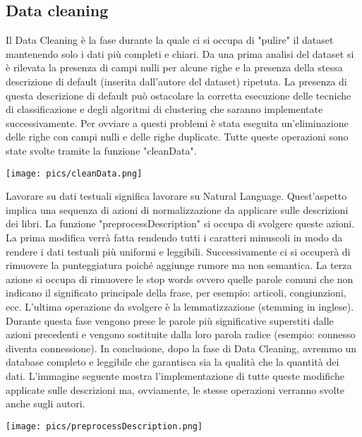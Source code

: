 \documentclass[12pt,oneside]{article}
\begin{document}
    \begin{enumerate}
    \subsection{Data cleaning}
    \begin{justify}
    Il Data Cleaning è la fase durante la quale ci si occupa di "pulire" il dataset mantenendo solo i dati più completi e chiari. Da una prima analisi del dataset si è rilevata la presenza di campi nulli per alcune righe e la presenza della stessa descrizione di default (inserita dall'autore del dataset) ripetuta. La presenza di questa descrizione di default può ostacolare la corretta esecuzione delle tecniche di classificazione e degli algoritmi di clustering che saranno implementate successivamente. Per ovviare a questi problemi è stata eseguita un'eliminazione delle righe con campi nulli e delle righe duplicate. Tutte queste operazioni sono state svolte tramite la funzione "cleanData".
    \end{justify}
    \texttt{[image: pics/cleanData.png]}
    \begin{justify}
    Lavorare su dati testuali significa lavorare su Natural Language. Quest'aspetto implica una sequenza di azioni di normalizzazione da applicare sulle descrizioni dei libri. La funzione "preprocessDescription" si occupa di svolgere queste azioni. La prima modifica verrà fatta rendendo tutti i caratteri minuscoli in modo da rendere i dati testuali più uniformi e leggibili. Successivamente ci si occuperà di rimuovere la punteggiatura poiché aggiunge rumore ma non semantica. La terza azione si occupa di rimuovere le stop words ovvero quelle parole comuni che non indicano il significato principale della frase, per esempio: articoli, congiunzioni, ecc. L'ultima operazione da svolgere è la lemmatizzazione (stemming in inglese). Durante questa fase vengono prese le parole più significative superstiti dalle azioni precedenti e vengono sostituite dalla loro parola radice (esempio: connesso diventa connessione). In conclusione, dopo la fase di Data Cleaning, avremmo un database completo e leggibile che garantisca sia la qualità che la quantità dei dati. L'immagine seguente mostra l'implementazione di tutte queste modifiche applicate sulle descrizioni ma, ovviamente, le stesse operazioni verranno svolte anche sugli autori.
    \end{justify}
    \texttt{[image: pics/preprocessDescription.png]}
    \end{enumerate}
\end{document}
